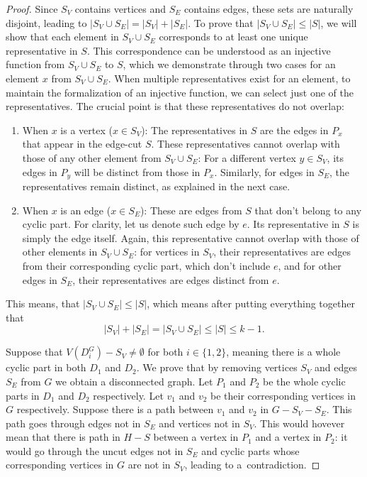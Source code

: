 \documentclass[12pt, twoside]{book}
\begin{document}
\begin{proof}
	Since $S_V$ contains vertices and $S_E$ contains edges, these sets are naturally disjoint, leading to $|S_V\cup S_E|=|S_V|+|S_E|$. To prove that $|S_V\cup S_E|\leq |S|$, we will show that each element in $S_V\cup S_E$ corresponds to at least one unique representative in $S$. This correspondence can be understood as an injective function from $S_V\cup S_E$ to $S$, which we demonstrate through two cases for an element $x$ from $S_V\cup S_E$. When multiple representatives exist for an element, to maintain the formalization of an injective function, we can select just one of the representatives. The crucial point is that these representatives do not overlap:
	\begin{enumerate}
		\item When $x$ is a vertex ($x\in S_V$): The representatives in $S$ are the edges in $P_x$ that appear in the edge-cut $S$. These representatives cannot overlap with those of any other element from $S_V\cup S_E$: For a different vertex $y\in S_V$, its edges in $P_y$ will be distinct from those in $P_x$. Similarly, for edges in $S_E$, the representatives remain distinct, as explained in the next case.
		\item When $x$ is an edge ($x\in S_E$): These are edges from $S$ that don't belong to any cyclic part. For clarity, let us denote such edge by $e$. Its representative in $S$ is simply the edge itself. Again, this representative cannot overlap with those of other elements in $S_V\cup S_E$: for vertices in $S_V$, their representatives are edges from their corresponding cyclic part, which don't include $e$, and for other edges in $S_E$, their representatives are edges distinct from $e$.
	\end{enumerate} 
	
	This means, that $|S_V\cup S_E|\leq |S|$, which means after putting everything together that $$|S_V|+|S_E|=|S_V\cup S_E|\leq |S|\leq k-1.$$
	
	Suppose that $V(D_i^G)-S_V\neq\emptyset$ for both $i\in \{1,2\}$, meaning there is a whole cyclic part in both $D_1$ and $D_2$. We prove that by removing vertices $S_V$ and edges $S_E$ from $G$ we obtain a disconnected graph. Let $P_1$ and $P_2$ be the whole cyclic parts in $D_1$ and $D_2$ respectively. Let $v_1$ and $v_2$ be their corresponding vertices in $G$ respectively. Suppose there is a path between $v_1$ and $v_2$ in $G-S_V-S_E$. This path goes through edges not in $S_E$ and vertices not in $S_V$. This would hovever mean that there is path in $H-S$ between a vertex in $P_1$ and a vertex in $P_2$: it would go through the uncut edges not in $S_E$ and cyclic parts whose corresponding vertices in $G$ are not in $S_V$, leading to a~contradiction.
	

\end{proof}
\end{document}
